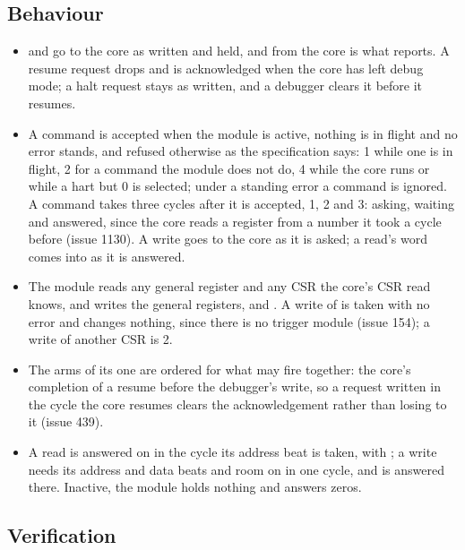 
\subsection*{Behaviour}

\begin{itemize}
\item {} and  go to the core as written
and held, and  from the core is what 
reports. A resume request drops and is acknowledged when the core has
left debug mode; a halt request stays as written, and a debugger
clears it before it resumes.
\item A command is accepted when the module is active, nothing is in
flight and no error stands, and refused otherwise as the
specification says:  1 while one is in flight, 2 for a
command the module does not do, 4 while the core runs or while a hart
but 0 is selected; under a standing error a command is ignored. A
command takes three cycles after it is accepted,  1, 2
and 3: asking, waiting and answered, since the core reads a register
from a number it took a cycle before (issue 1130). A write goes to the
core as it is asked; a read's word comes into  as it is
answered.
\item The module reads any general register and any CSR the core's
CSR read knows, and writes the general registers,  and
. A write of  is taken with no error and
changes nothing, since there is no trigger module (issue 154); a
write of another CSR is  2.
\item The arms of its one  are ordered for what may fire
together: the core's completion of a resume before the debugger's
write, so a request written in the cycle the core resumes clears the
acknowledgement rather than losing to it (issue 439).
\item A read is answered on  in the cycle its address beat is
taken, with ; a write needs its address and data beats and
room on  in one cycle, and is answered  there.
Inactive, the module holds nothing and answers zeros.
\end{itemize}

\subsection*{Verification}

